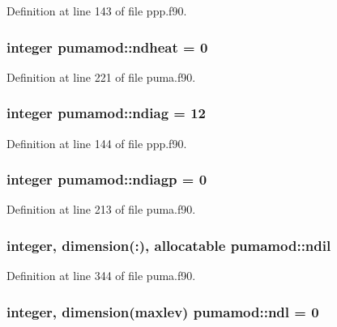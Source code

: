 \-Definition at line 143 of file ppp.\-f90.

\hypertarget{classpumamod_a8e7c1d42543d35f7caba5ebd36dcfd54}{
\subsubsection[{ndheat}]{\setlength{\rightskip}{0pt plus 5cm}integer {\bf pumamod\-::ndheat} = 0}}
\label{classpumamod_a8e7c1d42543d35f7caba5ebd36dcfd54}


\-Definition at line 221 of file puma.\-f90.

\hypertarget{classpumamod_a54f043f98baef026666945f1440f91b5}{
\subsubsection[{ndiag}]{\setlength{\rightskip}{0pt plus 5cm}integer {\bf pumamod\-::ndiag} = 12}}
\label{classpumamod_a54f043f98baef026666945f1440f91b5}


\-Definition at line 144 of file ppp.\-f90.

\hypertarget{classpumamod_a996f9145950ee7b3955819b122de4957}{
\subsubsection[{ndiagp}]{\setlength{\rightskip}{0pt plus 5cm}integer {\bf pumamod\-::ndiagp} = 0}}
\label{classpumamod_a996f9145950ee7b3955819b122de4957}


\-Definition at line 213 of file puma.\-f90.

\hypertarget{classpumamod_a8cd6f320c3166f241ade820dc3eadb39}{
\subsubsection[{ndil}]{\setlength{\rightskip}{0pt plus 5cm}integer, dimension(\-:), allocatable {\bf pumamod\-::ndil}}}
\label{classpumamod_a8cd6f320c3166f241ade820dc3eadb39}


\-Definition at line 344 of file puma.\-f90.

\hypertarget{classpumamod_a15b0384953f7f10aa3e03dee7662e0f3}{
\subsubsection[{ndl}]{\setlength{\rightskip}{0pt plus 5cm}integer, dimension(maxlev) {\bf pumamod\-::ndl} = 0}}
\label{classpumamod_a15b0384953f7f10aa3e03dee7662e0f3}


